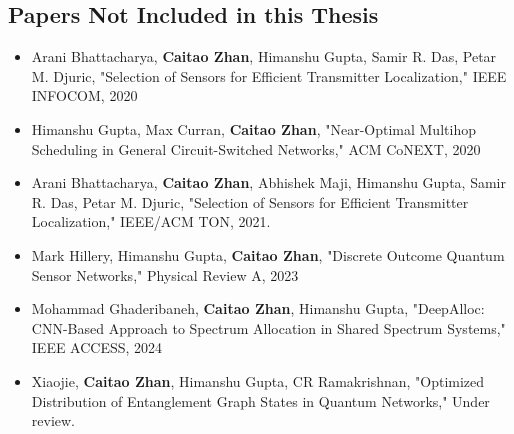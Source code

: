 \subsection*{Papers Not Included in this Thesis}
\begin{itemize}
    \item Arani Bhattacharya, \textbf{Caitao Zhan}, Himanshu Gupta, Samir R. Das, Petar M. Djuric, "Selection of Sensors for Efficient Transmitter Localization," IEEE INFOCOM, 2020

    \item Himanshu Gupta, Max Curran, \textbf{Caitao Zhan}, "Near-Optimal Multihop Scheduling in General Circuit-Switched Networks," ACM CoNEXT, 2020

    \item Arani Bhattacharya, \textbf{Caitao Zhan}, Abhishek Maji, Himanshu Gupta, Samir R. Das, Petar M. Djuric, "Selection of Sensors for Efficient Transmitter Localization," IEEE/ACM TON, 2021.

    \item Mark Hillery, Himanshu Gupta, \textbf{Caitao Zhan}, "Discrete Outcome Quantum Sensor Networks," Physical Review A, 2023

    \item Mohammad Ghaderibaneh, \textbf{Caitao Zhan}, Himanshu Gupta, "DeepAlloc: CNN-Based Approach to Spectrum Allocation in Shared Spectrum Systems," IEEE ACCESS, 2024

    \item Xiaojie, \textbf{Caitao Zhan}, Himanshu Gupta, CR Ramakrishnan, "Optimized Distribution of Entanglement Graph States in Quantum Networks," Under review.
\end{itemize}

